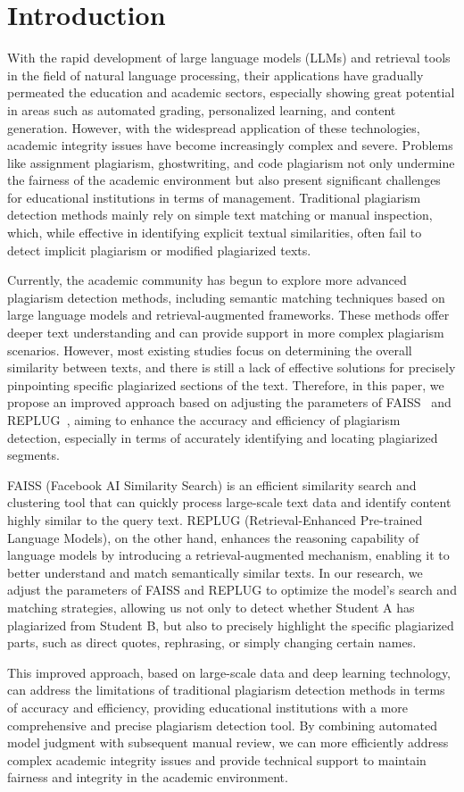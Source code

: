 \section{Introduction}
With the rapid development of large language models (LLMs) and retrieval tools in the field of natural language processing, their applications have gradually permeated the education and academic sectors, especially showing great potential in areas such as automated grading, personalized learning, and content generation. However, with the widespread application of these technologies, academic integrity issues have become increasingly complex and severe. Problems like assignment plagiarism, ghostwriting, and code plagiarism not only undermine the fairness of the academic environment but also present significant challenges for educational institutions in terms of management. Traditional plagiarism detection methods mainly rely on simple text matching or manual inspection, which, while effective in identifying explicit textual similarities, often fail to detect implicit plagiarism or modified plagiarized texts.

Currently, the academic community has begun to explore more advanced plagiarism detection methods, including semantic matching techniques based on large language models and retrieval-augmented frameworks. These methods offer deeper text understanding and can provide support in more complex plagiarism scenarios. However, most existing studies focus on determining the overall similarity between texts, and there is still a lack of effective solutions for precisely pinpointing specific plagiarized sections of the text. Therefore, in this paper, we propose an improved approach based on adjusting the parameters of FAISS~\cite{FAISS} and REPLUG~\cite{REPLUG}, aiming to enhance the accuracy and efficiency of plagiarism detection, especially in terms of accurately identifying and locating plagiarized segments.

FAISS (Facebook AI Similarity Search) is an efficient similarity search and clustering tool that can quickly process large-scale text data and identify content highly similar to the query text. REPLUG (Retrieval-Enhanced Pre-trained Language Models), on the other hand, enhances the reasoning capability of language models by introducing a retrieval-augmented mechanism, enabling it to better understand and match semantically similar texts. In our research, we adjust the parameters of FAISS and REPLUG to optimize the model's search and matching strategies, allowing us not only to detect whether Student A has plagiarized from Student B, but also to precisely highlight the specific plagiarized parts, such as direct quotes, rephrasing, or simply changing certain names.

This improved approach, based on large-scale data and deep learning technology, can address the limitations of traditional plagiarism detection methods in terms of accuracy and efficiency, providing educational institutions with a more comprehensive and precise plagiarism detection tool. By combining automated model judgment with subsequent manual review, we can more efficiently address complex academic integrity issues and provide technical support to maintain fairness and integrity in the academic environment.